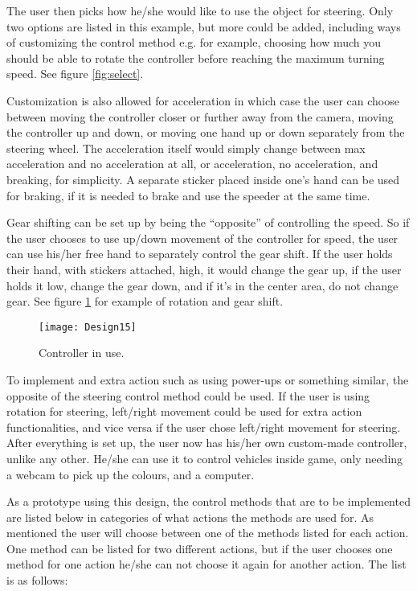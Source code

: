 The user then picks how he/she would like to use the object for steering. Only two options are listed in this example, but more could be added, including ways of customizing the control method e.g. for example, choosing how much you should be able to rotate the controller before reaching the maximum turning speed. See figure \ref{fig:select}.

\bigskip

Customization is also allowed for acceleration in which case the user can choose between moving the controller closer or further away from the camera, moving the controller up and down, or moving one hand up or down separately from the steering wheel. 
The acceleration itself would simply change between max acceleration and no acceleration at all, or acceleration, no acceleration, and breaking, for simplicity. A separate sticker placed inside one’s hand can be used for braking, if it is needed to brake and use the speeder at the same time.

\bigskip

Gear shifting can be set up by being the “opposite” of controlling the speed. So if the user chooses to use up/down movement of the controller for speed, the user can use his/her free hand to separately control the gear shift. If the user holds their hand, with stickers attached, high, it would change the gear up, if the user holds it low, change the gear down, and if it’s in the center area, do not change gear. See figure \ref{fig:design15} for example of rotation and gear shift.

\begin{figure}[h]
\centering
\texttt{[image: Design15]}
\caption{Controller in use.}
\label{fig:design15}
\end{figure}

To implement and extra action such as using power-ups or something similar, the opposite
of the steering control method could be used. If the user is using rotation for steering,
left/right movement could be used for extra action functionalities, and vice versa if the user
chose left/right movement for steering. After everything is set up, the user now has his/her own custom-made controller, unlike any other. He/she can use it to control vehicles inside game, only needing a webcam to pick up the colours, and a computer.
\bigskip

As a prototype using this design, the control methods that are to be implemented are listed below in categories of what actions the methods are used for. As mentioned the user will choose between one of the methods listed for each action. One method can be listed for two different actions, but if the user chooses one method for one action he/she can not choose it again for another action. The list is as follows:

